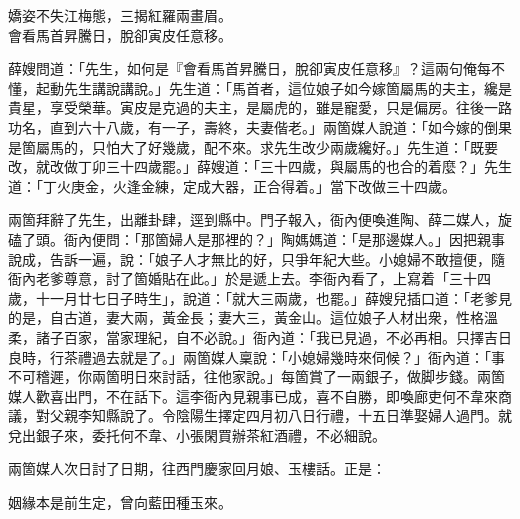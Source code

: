 \begin{myquote}
嬌姿不失江梅態，三揭紅羅兩畫眉。\\會看馬首昇騰日，脫卻寅皮任意移。
\end{myquote}

薛嫂問道：「先生，如何是『會看馬首昇騰日，脫卻寅皮任意移』？這兩句俺每不懂，起動先生講說講說。」先生道：「馬首者，這位娘子如今嫁箇屬馬的夫主，纔是貴星，享受榮華。寅皮是克過的夫主，是屬虎的，雖是寵愛，只是偏房。往後一路功名，直到六十八歲，有一子，壽終，夫妻偕老。」兩箇媒人說道：「如今嫁的倒果是箇屬馬的，只怕大了好幾歲，配不來。求先生改少兩歲纔好。」先生道：「既要改，就改做丁卯三十四歲罷。」薛嫂道：「三十四歲，與屬馬的也合的着麼？」先生道：「丁火庚金，火逢金練，定成大器，正合得着。」當下改做三十四歲。

兩箇拜辭了先生，出離卦肆，逕到縣中。門子報入，衙內便喚進陶、薛二媒人，旋磕了頭。衙內便問：「那箇婦人是那裡的？」陶媽媽道：「是那邊媒人。」因把親事說成，告訴一遍，說：「娘子人才無比的好，只爭年紀大些。小媳婦不敢擅便，隨衙內老爹尊意，討了箇婚貼在此。」於是遞上去。李衙內看了，上寫着「三十四歲，十一月廿七日子時生」，說道：「就大三兩歲，也罷。」薛嫂兒插口道：「老爹見的是，自古道，妻大兩，黃金長；妻大三，黃金山。{}這位娘子人材出衆，性格溫柔，諸子百家，當家理紀，自不必說。」衙內道：「我已見過，不必再相。只擇吉日良時，行茶禮過去就是了。」兩箇媒人稟說：「小媳婦幾時來伺候？」衙內道：「事不可稽遲，你兩箇明日來討話，往他家說。」每箇賞了一兩銀子，做脚步錢。兩箇媒人歡喜出門，不在話下。這李衙內見親事已成，喜不自勝，即喚廊吏何不韋來商議，對父親李知縣說了。令陰陽生擇定四月初八日行禮，十五日準娶婦人過門。就兌出銀子來，委托何不韋、小張閑買辦茶紅酒禮，不必細說。

兩箇媒人次日討了日期，往西門慶家回月娘、玉樓話。正是：

\begin{myquote}
姻緣本是前生定，曾向藍田種玉來。
\end{myquote}

